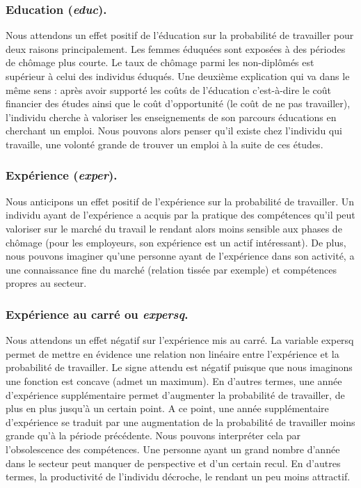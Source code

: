 \subsubsection*{Education (\emph{educ}).}

Nous attendons un effet positif de l’éducation sur la probabilité de travailler pour deux raisons principalement. Les femmes éduquées sont exposées à des périodes de chômage plus courte. Le taux de chômage parmi les non-diplômés est supérieur à celui des individus éduqués. Une deuxième explication qui va dans le même sens : après avoir supporté les coûts de l’éducation c'est-à-dire le coût financier des études ainsi que le coût d’opportunité (le coût de ne pas travailler), l’individu cherche à valoriser les enseignements de son parcours éducations en cherchant un emploi. Nous pouvons alors penser qu’il existe chez l’individu qui travaille, une volonté grande de trouver un emploi à la suite de ces études. 

\subsubsection*{Expérience (\emph{exper}).}


Nous anticipons un effet positif de l’expérience sur la probabilité de travailler. Un individu ayant de l’expérience a acquis par la pratique des compétences qu’il peut valoriser sur le marché du travail le rendant alors moins sensible aux phases de chômage (pour les employeurs, son expérience est un actif intéressant). De plus, nous pouvons imaginer qu’une personne ayant de l’expérience dans son activité, a une connaissance fine du marché (relation tissée par exemple) et compétences propres au secteur.

\subsubsection*{Expérience au carré ou \emph{expersq}.}

Nous attendons un effet négatif sur l’expérience mis au carré. La variable expersq permet de mettre en évidence une relation non linéaire entre l’expérience et la probabilité de travailler. Le signe attendu est négatif puisque que nous imaginons une fonction est concave (admet un maximum). En d’autres termes, une année d’expérience supplémentaire permet d’augmenter la probabilité de travailler, de plus en plus jusqu’à un certain point. A ce point, une année supplémentaire d’expérience se traduit par une augmentation de la probabilité de travailler moins grande qu’à la période précédente. Nous pouvons interpréter cela par l’obsolescence des compétences. Une personne ayant un grand nombre d’année dans le secteur peut manquer de perspective et d’un certain recul. En d’autres termes, la productivité de l’individu décroche, le rendant un peu moins attractif. 

